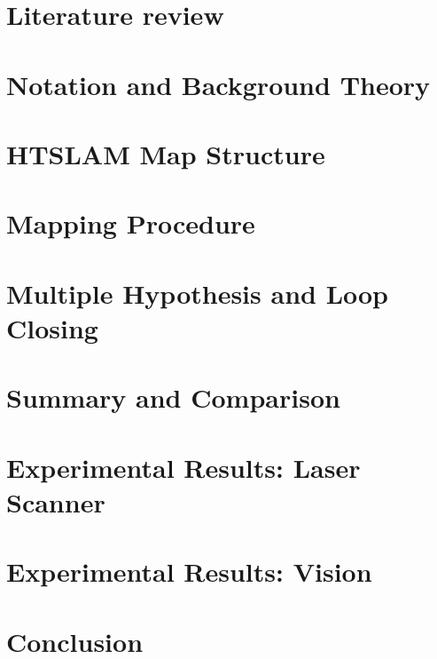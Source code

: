 \documentclass[11pt,onecolum,a4paper,oneside]{book}
\begin{document}

\tableofcontents
\listoffigures


\chapter{Literature review}
\label{chpt:LiteratureReview}



\chapter{Notation and Background Theory}
\label{chpt:Overview}



\chapter{HTSLAM Map Structure}
\label{chpt:MapStructure}


\chapter{Mapping Procedure}
\label{chpt:Mapping}


\chapter{Multiple Hypothesis and Loop Closing}
\label{chpt:LoopClosing}


\chapter{Summary and Comparison}


\chapter{Experimental Results: Laser Scanner}
\label{chpt:Laser_Results}


\chapter{Experimental Results: Vision}
\label{chpt:Vision_Results}


\chapter{Conclusion}




\end{document}
